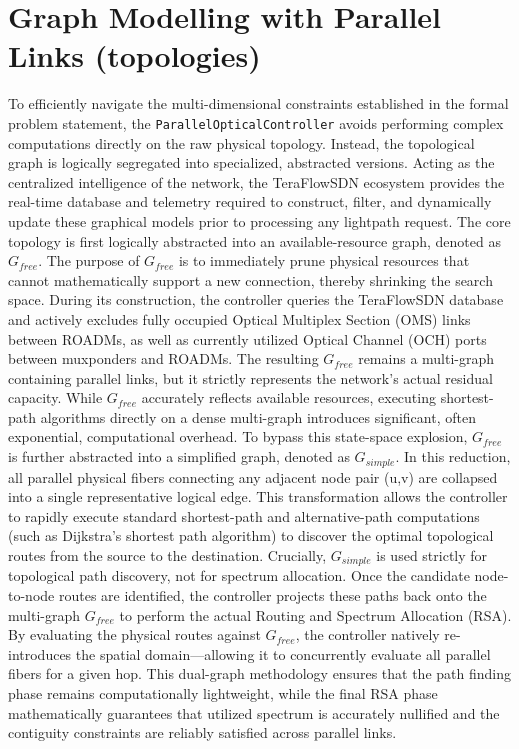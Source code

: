 \section{Graph Modelling with Parallel Links (topologies)}
To efficiently navigate the multi-dimensional constraints established in the formal problem statement, the \texttt{ParallelOpticalController} avoids performing complex computations directly on the raw physical topology. Instead, the topological graph is logically segregated into specialized, abstracted versions. Acting as the centralized intelligence of the network, the TeraFlowSDN ecosystem provides the real-time database and telemetry required to construct, filter, and dynamically update these graphical models prior to processing any lightpath request. The core topology is first logically abstracted into an available-resource graph, denoted as $G_{free}$. The purpose of $G_{free}$ is to immediately prune physical resources that cannot mathematically support a new connection, thereby shrinking the search space. During its construction, the controller queries the TeraFlowSDN database and actively excludes fully occupied Optical Multiplex Section (OMS) links between ROADMs, as well as currently utilized Optical Channel (OCH) ports between muxponders and ROADMs. The resulting $G_{free}$ remains a multi-graph containing parallel links, but it strictly represents the network's actual residual capacity. While $G_{free}$ accurately reflects available resources, executing shortest-path algorithms directly on a dense multi-graph introduces significant, often exponential, computational overhead. To bypass this state-space explosion, $G_{free}$ is further abstracted into a simplified graph, denoted as $G_{simple}$. In this reduction, all parallel physical fibers connecting any adjacent node pair (u,v) are collapsed into a single representative logical edge. This transformation allows the controller to rapidly execute standard shortest-path and alternative-path computations (such as Dijkstra's shortest path algorithm) to discover the optimal topological routes from the source to the destination. Crucially, $G_{simple}$ is used strictly for topological path discovery, not for spectrum allocation. Once the candidate node-to-node routes are identified, the controller projects these paths back onto the multi-graph $G_{free}$ to perform the actual Routing and Spectrum Allocation (RSA). By evaluating the physical routes against $G_{free}$, the controller natively re-introduces the spatial domain—allowing it to concurrently evaluate all parallel fibers for a given hop. This dual-graph methodology ensures that the path finding phase remains computationally lightweight, while the final RSA phase mathematically guarantees that utilized spectrum is accurately nullified and the contiguity constraints are reliably satisfied across parallel links.
